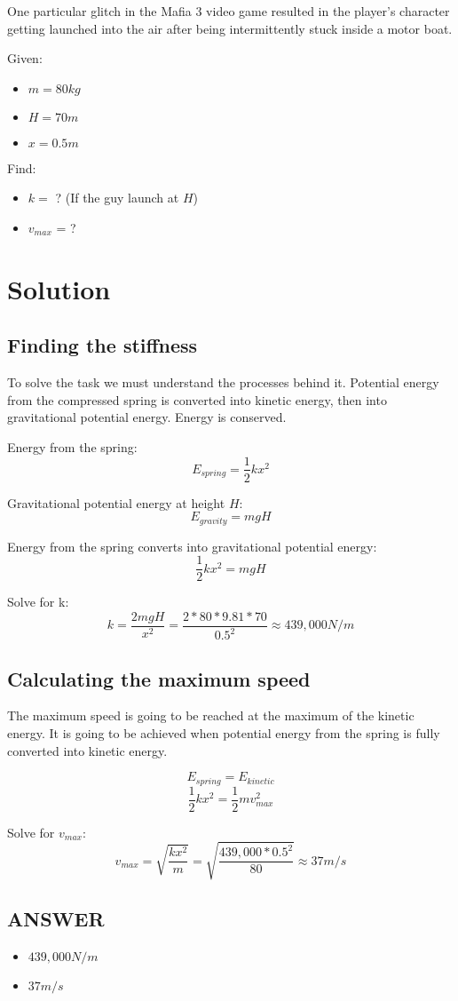 One particular glitch in the Mafia 3 video game resulted in the player’s character getting launched
into the air after being intermittently stuck inside a motor boat.

\bigbreak Given:
\begin{itemize}
    \item $m = 80kg$
    \item $H = 70m$
    \item $x = 0.5m$
\end{itemize}

\bigbreak Find: 
\begin{itemize}
    \item $k =$ ? (If the guy launch at $H$)
    \item $v_{max}$ = ?
\end{itemize}

\section*{Solution} \subsection*{Finding the stiffness}
To solve the task we must understand the processes behind it.
Potential energy from the compressed spring is converted into kinetic energy,
then into gravitational potential energy. Energy is conserved. 

\bigbreak Energy from the spring: $$ E_{spring} = \frac{1}{2}kx^2 $$

\bigbreak Gravitational potential energy at height $H$: $$ E_{gravity} = mgH $$

\bigbreak Energy from the spring converts into gravitational potential energy: 
$$ \frac{1}{2}kx^2 = mgH $$

Solve for k: $$ k = \frac{2mgH}{x^2} = \frac{2* 80 * 9.81 * 70}{0.5^2} \approx \boxed{439,000N/m} $$

\subsection*{Calculating the maximum speed}
The maximum speed is going to be reached at the maximum of the kinetic energy.
It is going to be achieved when potential energy from the spring is fully converted into kinetic energy.

$$ E_{spring} = E_{kinetic} $$
$$ \frac{1}{2}kx^2 = \frac{1}{2}mv_{max}^2 $$

Solve for $v_{max}$:
$$ v_{max} = \sqrt{\frac{kx^2}{m}} = \sqrt{\frac{439,000 * 0.5^2}{80}} \approx \boxed{37 m/s} $$

\vfill \subsection*{ANSWER}
\begin{itemize}
    \item $439,000N/m$
    \item $37 m/s$
\end{itemize}


